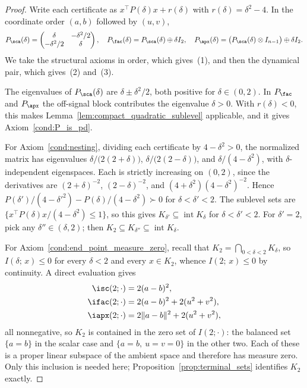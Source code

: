 \documentclass{article}
\begin{document}
\begin{proof}
Write each certificate as $x^\top P(\delta)x+r(\delta)$ with
$r(\delta)=\delta^2-4$. In the coordinate order $(a,b)$ followed by $(u,v)$,
\begin{align}
    P_\sca(\delta)
    =
    \begin{pmatrix}
        \delta & -\delta^2/2\\
        -\delta^2/2 & \delta
    \end{pmatrix},
    \quad
    P_\fac(\delta)=P_\sca(\delta)\oplus\delta I_2,
    \quad
    P_\apx(\delta)=\bigl(P_\sca(\delta)\otimes I_{n-1}\bigr)\oplus\delta I_2 .
\end{align}
We take the structural axioms in order, which gives~(1), and then the dynamical
pair, which gives~(2) and~(3).

The eigenvalues of $P_\sca(\delta)$ are $\delta\pm\delta^2/2$, both positive
for $\delta\in(0,2)$. In $P_\fac$ and $P_\apx$ the off-signal block contributes
the eigenvalue $\delta>0$. With $r(\delta)<0$, this makes
Lemma~\ref{lem:compact_quadratic_sublevel} applicable, and it gives
Axiom~\ref{cond:P_is_pd}.

For Axiom~\ref{cond:nesting}, dividing each certificate by $4-\delta^2>0$, the normalized matrix
has eigenvalues $\delta/\bigl(2(2+\delta)\bigr)$,
$\delta/\bigl(2(2-\delta)\bigr)$, and $\delta/(4-\delta^2)$, with
$\delta$-independent eigenspaces. Each is strictly increasing on $(0,2)$, 
since the derivatives are $(2+\delta)^{-2}$, $(2-\delta)^{-2}$, and
$(4+\delta^2)(4-\delta^2)^{-2}$. Hence
$P(\delta')/(4-\delta'^2)-P(\delta)/(4-\delta^2)\succ0$ for
$\delta<\delta'<2$. The sublevel sets are
$\{x^\top P(\delta)x/(4-\delta^2)\le1\}$, so this gives
$K_{\delta'}\subseteq\operatorname{int}K_\delta$ for $\delta<\delta'<2$. For
$\delta'=2$, pick any $\delta''\in(\delta,2)$; then
$K_2\subseteq K_{\delta''}\subseteq\operatorname{int}K_\delta$.

For Axiom~\ref{cond:end_point_measure_zero}, recall that
$K_2=\bigcap_{0<\delta<2}K_\delta$, so $I(\delta;\,x)\le0$ for every
$\delta<2$ and every $x\in K_2$, whence $I(2;\,x)\le0$ by continuity. A direct
evaluation gives
\begin{align}
\begin{aligned}
    \isc(2;\cdot) &= 2(a-b)^2,\\
    \ifac(2;\cdot) &= 2(a-b)^2+2(u^2+v^2),\\
    \iapx(2;\cdot) &= 2\|a-b\|^2+2(u^2+v^2),
\end{aligned}
\end{align}
all nonnegative, so $K_2$ is contained in the zero set of $I(2;\cdot)$: the
balanced set $\{a=b\}$ in the scalar case and $\{a=b,\ u=v=0\}$ in the other
two. Each of these is a proper linear subspace of the ambient space and
therefore has measure zero. Only this inclusion is needed here;
Proposition~\ref{prop:terminal_sets} identifies $K_2$ exactly.


\end{proof}
\end{document}
